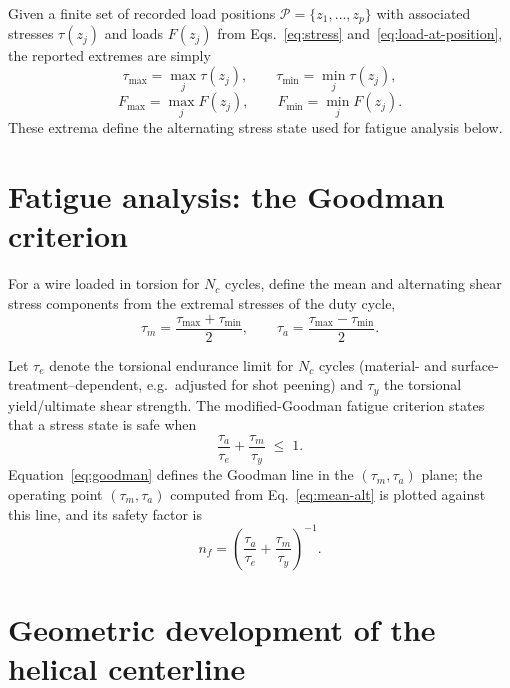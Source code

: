 \documentclass[11pt]{article}
\begin{document}
Given a finite set of recorded load positions
$\mathcal{P} = \{z_1,\dots,z_p\}$ with associated stresses
$\tau(z_j)$ and loads $F(z_j)$ from Eqs.~\eqref{eq:stress}
and~\eqref{eq:load-at-position}, the reported extremes are simply
\begin{equation}
\tau_{\max} = \max_{j} \tau(z_j), \qquad
\tau_{\min} = \min_{j} \tau(z_j),
\end{equation}
\begin{equation}
F_{\max} = \max_{j} F(z_j), \qquad
F_{\min} = \min_{j} F(z_j).
\end{equation}
These extrema define the alternating stress state used for fatigue
analysis below.

\section{Fatigue analysis: the Goodman criterion}

For a wire loaded in torsion for $N_c$ cycles, define the mean and
alternating shear stress components from the extremal stresses of the
duty cycle,
\begin{equation}
\tau_m = \frac{\tau_{\max}+\tau_{\min}}{2}, \qquad
\tau_a = \frac{\tau_{\max}-\tau_{\min}}{2}.
\label{eq:mean-alt}
\end{equation}

Let $\tau_e$ denote the torsional endurance limit for $N_c$ cycles
(material- and surface-treatment–dependent, e.g.\ adjusted for shot
peening) and $\tau_y$ the torsional yield/ultimate shear strength. The
modified-Goodman fatigue criterion states that a stress state is safe
when
\begin{equation}
\frac{\tau_a}{\tau_e} + \frac{\tau_m}{\tau_y} \;\le\; 1 .
\label{eq:goodman}
\end{equation}
Equation~\eqref{eq:goodman} defines the Goodman line in the
$(\tau_m,\tau_a)$ plane; the operating point $(\tau_m,\tau_a)$ computed
from Eq.~\eqref{eq:mean-alt} is plotted against this line, and its safety
factor is
\begin{equation}
n_f = \left(\frac{\tau_a}{\tau_e} + \frac{\tau_m}{\tau_y}\right)^{-1}.
\label{eq:safety-factor}
\end{equation}

\section{Geometric development of the helical centerline}
\end{document}

